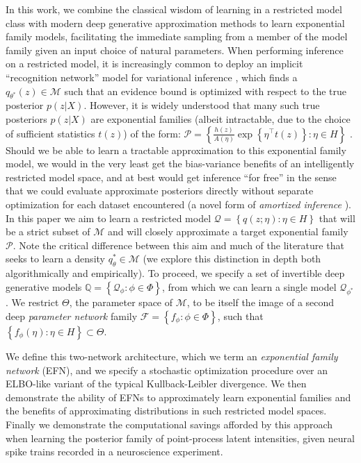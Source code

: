 \documentclass{article}
\begin{document}
In this work, we combine the classical wisdom of learning in a restricted model class with modern deep generative approximation methods to learn exponential family models, facilitating the immediate sampling from a member of the model family given an input choice of natural parameters.  When performing inference on a restricted model, it is increasingly common to deploy an implicit ``recognition network'' model for variational inference \citep{Kingma:2013aa}, which finds a $q_{\theta^*}(z) \in \mathcal{M}$ such that an evidence bound is optimized with respect to the true posterior $p(z|X)$.  However, it is widely understood that many such true posteriors $p(z|X)$ are exponential families (albeit intractable, due to the choice of sufficient statistics $t(z)$) of the form: $\mathcal{P} = \left\{ \frac{h(z)}{A(\eta)} \exp\left\{ \eta^\top t(z) \right \} : \eta \in H \right\}$ \citep{wainwright2008graphical}.   Should we be able to learn a tractable approximation to this exponential family model, we would in the very least get the bias-variance benefits of an intelligently restricted model space, and at best would get inference ``for free'' in the sense that we could evaluate approximate posteriors directly without separate optimization for each dataset encountered (a novel form of \emph{amortized inference} \citep{gershman2014amortized,Kingma:2013aa,rezende2014stochastic,stuhlmuller2013learning}).  
 In this paper we aim to learn a restricted model $\mathcal{Q} = \left\{ q(z; \eta): \eta \in H \right\}$ that will be a strict subset of $\mathcal{M}$ and will closely approximate a target exponential family $\mathcal{P}$.  Note the critical difference between this aim and much of the literature that seeks to learn a density $q_{\theta}^* \in \mathcal{M}$ (we explore this distinction in depth both algorithmically and empirically).  To proceed, we specify a set of invertible deep generative models $\mathbb{Q} = \left\{ \mathcal{Q}_\phi : \phi \in \Phi \right\}$, from which we can learn a single model $\mathcal{Q}_{\phi^*}$.  We restrict $\Theta$, the parameter space of $\mathcal{M}$, to be itself the image of a second deep \emph{parameter network} family $\mathcal{F} = \left\{f_\phi : \phi \in \Phi\right\}$, such that $\left\{ f_\phi(\eta) : \eta \in H \right\} \subset \Theta$.

We define this two-network architecture, which we term an \emph{exponential family network} (EFN), and we specify a stochastic optimization procedure over an ELBO-like variant of the typical Kullback-Leibler divergence.  We then demonstrate the ability of EFNs to approximately learn exponential families and the benefits of approximating distributions in such restricted model spaces.  Finally we demonstrate the computational savings afforded by this approach when learning the posterior family of point-process latent intensities, given neural spike trains recorded in a neuroscience experiment.
\end{document}
